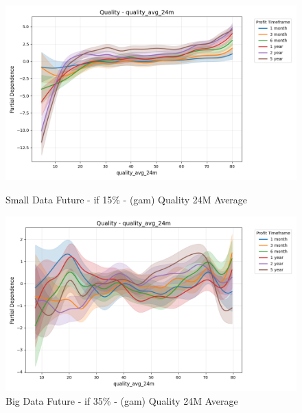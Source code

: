 \documentclass[11pt,english,a4paper,hidelinks]{book}
\begin{document}
\begin{figure}[H]
    \centering
    \begin{minipage}{0.48\textwidth}
        \centering
        \includegraphics[width=\textwidth]{images/code/models/general_regression/splines/2D/Small Data future - IF/quality_quality_avg_24m.png}
        \caption{Small Data Future - \acrshort{if} 15\% - (\acrshort{gam}) Quality 24M Average}
        \label{fig:spline_quality_quality_avg_24m}
    \end{minipage}\hfill
    \begin{minipage}{0.48\textwidth}
        \centering
        \includegraphics[width=\textwidth]{images/code/models/general_regression/splines/2D/Big Data future - IF HARD Balanced/quality_quality_avg_24m.png}
        \caption{Big Data Future - \acrshort{if} 35\% - (\acrshort{gam}) Quality 24M Average}
        \label{fig:spline_quality_quality_avg_24m_balanced}
    \end{minipage}
\end{figure}
\end{document}
